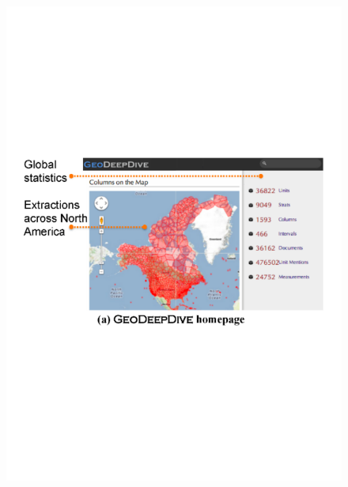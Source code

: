\begin{figure}
\begin{center}
\includegraphics[scale=0.6]{figures/geodeepdive-1.pdf}

\end{center}
\end{figure}
